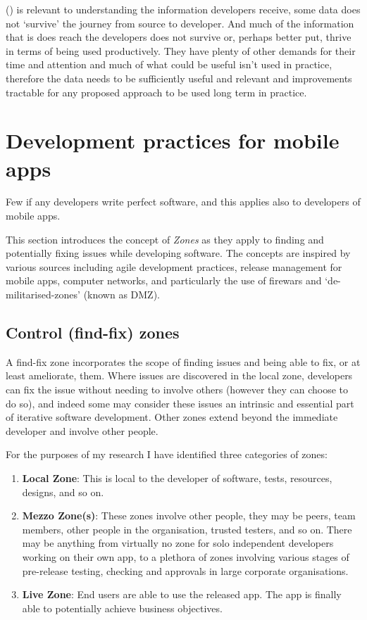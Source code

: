 () is relevant to understanding the information developers receive, some data does not `survive' the journey from source to developer. And much of the information that is does reach the developers does not survive or, perhaps better put, thrive in terms of being used productively. They have plenty of other demands for their time and attention and much of what could be useful isn't used in practice, therefore the data needs to be sufficiently useful and relevant and improvements tractable for any proposed approach to be used long term in practice.

\section{Development practices for mobile apps}
Few if any developers write perfect software, and this applies also to developers of mobile apps. 


This section introduces the concept of \textit{Zones} as they apply to finding and potentially fixing issues while developing software. The concepts are inspired by various sources including agile development practices, release management for mobile apps, computer networks, and particularly the use of firewars and `de-militarised-zones' (known as DMZ). 

\subsection{Control (find-fix) zones}
A find-fix zone incorporates the scope of finding issues and being able to fix, or at least ameliorate, them. Where issues are discovered in the local zone, developers can fix the issue without needing to involve others (however they can choose to do so), and indeed some may consider these issues an intrinsic and essential part of iterative software development. Other zones extend beyond the immediate developer and involve other people.

For the purposes of my research I have identified three categories of zones:
\begin{enumerate}
    \item \textbf{Local Zone}: This is local to the developer of software, tests, resources, designs, and so on.
    \item \textbf{Mezzo Zone(s)}: These zones involve other people, they may be peers, team members, other people in the organisation, trusted testers, and so on. There may be anything from virtually no zone for solo independent developers working on their own app, to a plethora of zones involving various stages of pre-release testing, checking and approvals in large corporate organisations.
    \item \textbf{Live Zone}: End users are able to use the released app. The app is finally able to potentially achieve business objectives. 
\end{enumerate}

